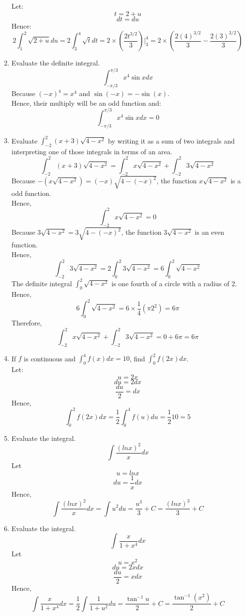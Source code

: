 \documentclass[12pt]{article}
\begin{document}
\begin{enumerate}
    Let:
    \[t = 2 + u\]
    \[dt = du\]
    Hence:
    \[2\int_{1}^{2} \sqrt{2 + u}du = 2\int_{3}^{4} \sqrt{t}dt = 2 \times (\frac{2t^{3/2}}{3})|^{4}_{3} = 2 \times (\frac{2(4)^{3/2}}{3} - \frac{2(3)^{3/2}}{3})\]
\setcounter{enumi}{47}
    \item Evaluate the definite integral.
    \[\int_{-\pi/3}^{\pi/3} x^4 \sin x dx\]
    Because $(-x)^4 = x^4$ and $\sin (-x) = - \sin (x)$.\\
    Hence, their multiply will be an odd function and:
    \[\int_{-\pi/3}^{\pi/3} x^4 \sin x dx = 0\]
\setcounter{enumi}{54}
    \item Evaluate $\int_{-2}^{2} (x+3)\sqrt{4-x^2}$ by writing it as a sum of two integrals and interpreting one of those integrals in terms of an area.
    \[\int_{-2}^{2} (x+3)\sqrt{4-x^2} = \int_{-2}^{2} x\sqrt{4-x^2} + \int_{-2}^{2} 3\sqrt{4-x^2}\]
    Because $- (x\sqrt{4-x^2}) = (-x)\sqrt{4-(-x)^2}$, the function $x\sqrt{4-x^2}$ is a odd function.\\
    Hence, 
    \[\int_{-2}^{2} x\sqrt{4-x^2} = 0\]
    Because $3\sqrt{4-x^2} = 3\sqrt{4-(-x)^2}$, the function $3\sqrt{4-x^2}$ is an even function.\\
    Hence, 
    \[\int_{-2}^{2} 3\sqrt{4-x^2} = 2\int_{0}^{2} 3\sqrt{4-x^2} = 6\int_{0}^{2} \sqrt{4-x^2}\]
    The definite integral $\int_{0}^{2} \sqrt{4-x^2}$ is one fourth of a circle with a radius of 2.\\
    Hence,
    \[6\int_{0}^{2} \sqrt{4-x^2} = 6 \times \frac{1}{4}(\pi 2^2) = 6\pi\]
    Therefore,
    \[\int_{-2}^{2} x\sqrt{4-x^2} + \int_{-2}^{2} 3\sqrt{4-x^2} = 0 + 6\pi = 6\pi\] 
\newpage
\setcounter{enumi}{58}
    \item If $f$ is continuous and $\int_{0}^{4} f(x)dx = 10$, find $\int_{0}^{2} f(2x) dx$.\\
    Let:
    \[u = 2x\]
    \[du = 2dx\]
    \[\frac{du}{2} = dx\]
    Hence,
    \[\int_{0}^{2} f(2x) dx = \frac{1}{2}\int_{0}^{4} f(u) du = \frac{1}{2}10 = 5\]
\setcounter{enumi}{68}
    \item Evaluate the integral.
    \[\int \frac{(ln x)^2}{x} dx\]
    Let
    \[u = ln x\]
    \[du = \frac{1}{x}dx\]
    Hence,
    \[\int \frac{(ln x)^2}{x} dx = \int u^2 du = \frac{u^3}{3} + C = \frac{(ln x)^3}{3} + C\]
\setcounter{enumi}{79}
    \item Evaluate the integral.
    \[\int \frac{x}{1+x^4}dx\]
    Let
    \[u = x^2\]
    \[du = 2xdx\]
    \[\frac{du}{2} = xdx\]
    Hence, 
    \[\int \frac{x}{1+x^4}dx = \frac{1}{2} \int \frac{1}{1 + u^2} du = \frac{\tan^{-1} u }{2} + C = \frac{\tan^{-1} (x^2) }{2} + C\]
\end{enumerate}
\end{document}
